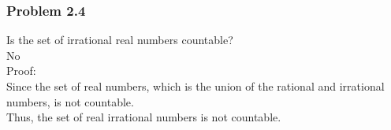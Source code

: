 \subsubsection*{Problem 2.4}
Is the set of irrational real numbers countable? \\ 
No\\ 
Proof:\\ 
Since the set of real numbers, which is the union of the rational and irrational numbers, is not countable. \\ 
Thus, the set of real irrational numbers is not countable. 
\begin{figure}[ht]\end{figure} 
\\
\newpage 

